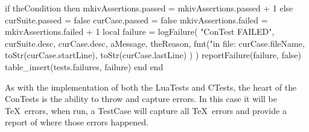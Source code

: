   if theCondition then
    mkivAssertions.passed = mkivAssertions.passed + 1
  else
    curSuite.passed = false
    curCase.passed  = false
    mkivAssertions.failed = mkivAssertions.failed + 1
    local failure = logFailure(
      "ConTest FAILED",
      curSuite.desc,
      curCase.desc,
      aMessage,
      theReason,
      fmt("in file: %
        curCase.fileName,
        toStr(curCase.startLine),
        toStr(curCase.lastLine)
      )
    )
    reportFailure(failure, false)
    table_insert(tests.failures, failure)
  end
end
\stopLuaCode

As with the implementation of both the LuaTests and CTests, the heart of 
the ConTests is the ability to throw and capture errors. In this case it 
will be \TeX\ errors, when run, a TestCase will capture all \TeX\ errors 
and provide a report of where those errors happened. 

%
%
%
%
%
%
%

%
%
%
%
%
%
%
%
%


